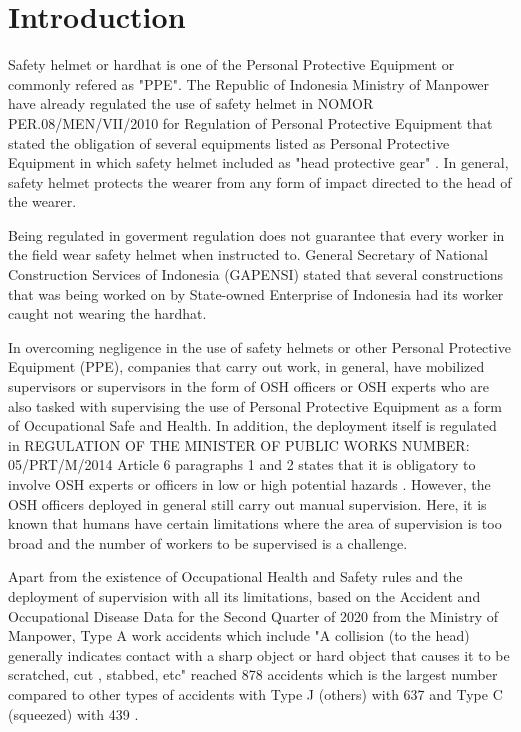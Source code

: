 \section{Introduction}
\label{sec:introduction}


\par Safety helmet or hardhat is one of the Personal Protective Equipment or commonly refered as "PPE".
 The Republic of Indonesia Ministry of Manpower have already regulated the use of safety helmet
 in NOMOR PER.08/MEN/VII/2010 for Regulation of Personal Protective Equipment that stated the obligation
 of several equipments listed as Personal Protective Equipment in which safety helmet included as "head protective gear" \cite{kementrianpekerjaanumum}.
 In general, safety helmet protects the wearer from any form of impact directed to the head of the wearer.

 \par Being regulated in goverment regulation does not guarantee that every worker
 in the field wear safety helmet when instructed to. General Secretary of National Construction Services of Indonesia
 (GAPENSI) stated that several constructions that was being worked on by State-owned Enterprise of Indonesia
 had its worker caught not wearing the hardhat. 

 \par In overcoming negligence in the use of safety helmets or other 
 Personal Protective Equipment (PPE), companies that carry out work, in general, have mobilized 
 supervisors or supervisors in the form of OSH officers or OSH experts 
 who are also tasked with supervising the use of Personal Protective Equipment
 as a form of Occupational Safe and Health. 
 In addition, the deployment itself is regulated in REGULATION OF THE 
 MINISTER OF PUBLIC WORKS NUMBER: 05/PRT/M/2014 Article 6 paragraphs 
 1 and 2 states that it is obligatory to involve OSH experts or 
 officers in low or high potential hazards \cite{suratkementriantenagakerja}. However, 
 the OSH officers deployed in general still carry out manual 
 supervision. Here, it is known that humans have certain 
 limitations where the area of supervision is too broad and the 
 number of workers to be supervised is a challenge.

 \par Apart from the existence of Occupational Health and Safety rules and the deployment 
 of supervision with all its limitations, based on the Accident 
 and Occupational Disease Data for the Second Quarter of 2020 
 from the Ministry of Manpower, Type A work accidents which 
 include "A collision (to the head) generally indicates 
 contact with a sharp object or hard object that causes 
 it to be scratched, cut , stabbed, etc" reached 878 accidents 
 which is the largest number compared to other types of 
 accidents with Type J (others) with 637 and Type C (squeezed) 
 with 439 \cite{satudata_kecelakaan_kerja}.